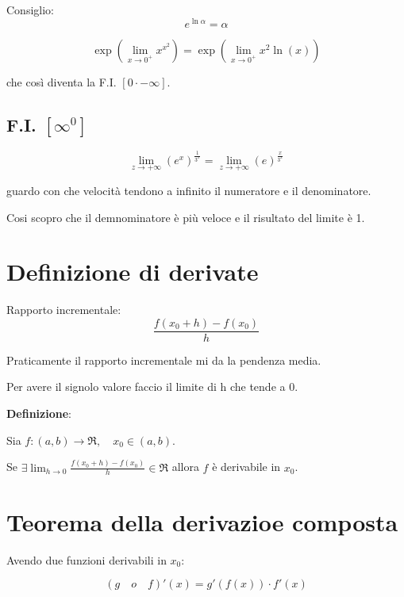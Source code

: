 Consiglio:
\begin{equation*}
    e^{\ln \alpha } = \alpha
\end{equation*}

\begin{equation*}
    \exp (\lim_{x \rightarrow 0^+} x^{x^2}) = \exp (\lim_{x \rightarrow 0^+} x^2 \ln (x)) 
\end{equation*}

che così diventa la F.I. $[0 \cdot -\infty]$.

\subsection{F.I. $[\infty^0]$}

\begin{equation*}
    \lim_{z \rightarrow +\infty} (e^x)^{\frac{1}{3^x}} = \lim_{z \rightarrow +\infty} (e)^{\frac{x}{3^x}}
\end{equation*}

guardo con che velocità tendono a infinito il numeratore e il denominatore.

Cosi scopro che il demnominatore è più veloce e il risultato del limite è 1.


\section{Definizione di derivate}
Rapporto incrementale:
\begin{equation*}
    \frac{f(x_0 + h) - f(x_0)}{h}
\end{equation*}

Praticamente il rapporto incrementale mi da la pendenza media.

Per avere il signolo valore faccio il limite di h che tende a 0.

\textbf{Definizione}:


Sia $f:(a,b) \rightarrow \Re, \quad x_0 \in (a,b)$.

Se $\exists \lim_{h \rightarrow 0} \frac{f(x_0 + h) - f(x_0)}{h} \in \Re$ allora $f$ è derivabile in $x_0$.

\section{Teorema della derivazioe composta}
Avendo due funzioni derivabili in $x_0$:

\begin{equation*}
    (g \quad o \quad f)'(x) = g'(f(x))\cdot f'(x)
\end{equation*}

